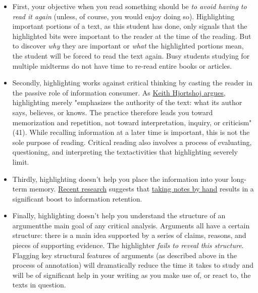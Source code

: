 \begin{itemize}

\item First, your objective when you read something should be \emph{to avoid having to read it again} (unless, of course, you would enjoy doing so). Highlighting important portions of a text, as this student has done, only signals that the highlighted bits were important to the reader at the time of the reading. But to discover \emph{why} they are important or \emph{what} the highlighted portions mean, the student will be forced to read the text again. Busy students studying for multiple midterms do not have time to re-read entire books or articles.  

\item Secondly, highlighting works against critical thinking by casting the reader in the passive role of information consumer. As \href{http://libcat.dartmouth.edu/record=6773185}{Keith Hjortshoj argues}, highlighting merely "emphasizes the authority of the text: what its author says, believes, or knows. The practice therefore leads you toward memorization and repetition, not toward interpretation, inquiry, or criticism" (41). While recalling information at a later time is important, this is not the sole purpose of reading. Critical reading also involves a process of evaluating, questioning, and interpreting the text\textemdash activities that highlighting severely limit.

\item Thirdly, highlighting doesn't help you place the information into your long-term memory. \href{https://sites.udel.edu/victorp/files/2010/11/Psychological-Science-2014-Mueller-0956797614524581-1u0h0yu.pdf}{Recent  
research} suggests that \href{https://www.scientificamerican.com/article/a-learning-secret-don-t-take-notes-with-a-laptop/}{taking notes by hand} results in a significant boost to information retention.

\item Finally, highlighting doesn't help you understand the structure of an argument\textemdash the main goal of any critical analysis. Arguments all have a certain structure: there is a main idea supported by a series of claims, reasons, and pieces of supporting evidence. The highlighter \emph{fails to reveal this structure}. Flagging key structural features of arguments (as described above in the process of annotation) will dramatically reduce the time it takes to study and will be of significant help in your writing as you make use of, or react to, the texts in question.

\end{itemize}

